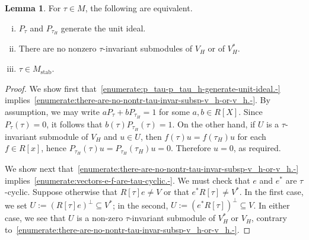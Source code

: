 \documentclass[reqno]{amsart}
\DeclareMathOperator{\stab}{stab}
\theoremstyle{plain} \newtheorem{theorem} {Theorem} \newtheorem{conjecture} {Conjecture} \newtheorem{corollary} [theorem] {Corollary} \newtheorem{proposition} [theorem] {Proposition} \newtheorem{fact} [theorem] {Fact}
\theoremstyle{definition} \newtheorem{definition} [theorem] {Definition}
\theoremstyle{itplain} %
\newtheorem{lemma}[theorem]{Lemma}
\begin{document}
\begin{lemma}\label{lemma:stability-equivalences}
  For $\tau \in M$, the following are equivalent.
  \begin{enumerate}[(i)]
  \item\label{enumerate:p_tau-p_tau_h-generate-unit-ideal.-} $P_\tau$ and $P_{\tau_H}$ generate the unit ideal.
  \item\label{enumerate:there-are-no-nontr-tau-invar-subsp-v_h-or-v_h.-} There are no nonzero $\tau$-invariant submodules of $V_H$ or of $V_H^*$.
  \item\label{enumerate:vectors-e-f-are-tau-cyclic.-} $\tau \in M_{\stab}$.
  \end{enumerate}
\end{lemma}
\begin{proof}
  We show first that~\eqref{enumerate:p_tau-p_tau_h-generate-unit-ideal.-} implies~\eqref{enumerate:there-are-no-nontr-tau-invar-subsp-v_h-or-v_h.-}. By assumption, we may write $a P_\tau + b P_{\tau_H} = 1$ for some $a,b \in R[X]$.  Since $P_\tau(\tau) = 0$, it follows that $b(\tau) P_{\tau_H}(\tau) = 1$.  On the other hand, if $U$ is a $\tau$-invariant submodule of $V_H$ and $u \in U$, then $f(\tau) u = f(\tau_H) u$ for each $f \in R[x]$, hence $P_{\tau_H}(\tau) u = P_{\tau_H}(\tau_H) u = 0$.  Therefore $u =0$, as required.

  We show next that~\eqref{enumerate:there-are-no-nontr-tau-invar-subsp-v_h-or-v_h.-} implies~\eqref{enumerate:vectors-e-f-are-tau-cyclic.-}.  We must check that $e$ and $e^*$ are $\tau$-cyclic.  Suppose otherwise that $R[\tau] e \neq V$ or that $e^* R[\tau] \neq V^*$.  In the first case, we set $U := {(R[\tau] e)}^\perp \subseteq V^*$; in the second, $U := {(e^* R [\tau ])}^\perp \subseteq V$.  In either case, we see that $U$ is a non-zero $\tau$-invariant submodule of $V_H^*$ or $V_H$, contrary to~\eqref{enumerate:there-are-no-nontr-tau-invar-subsp-v_h-or-v_h.-}.


\end{proof}
\end{document}
